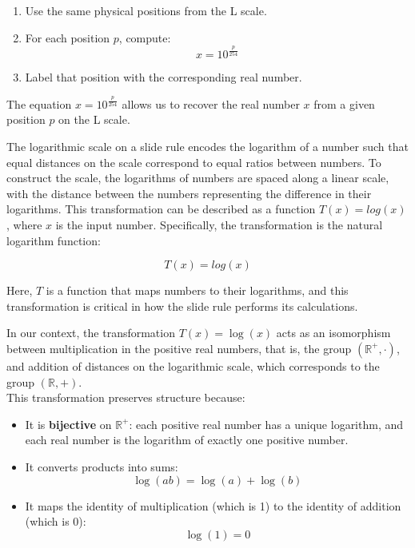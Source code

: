 \documentclass[10pt,twocolumn]{article}
\begin{document}
\begin{enumerate}
  \item Use the same physical positions from the L scale.
  \item For each position \( p \), compute:
  \[
  x = 10^{\frac{p}{254}}
  \]
  \item Label that position with the corresponding real number.
\end{enumerate}

The equation \( x = 10^{\frac{p}{254}} \) allows us to recover the real number \( x \) from a given position \( p \) on the L scale. 

The logarithmic scale on a slide rule encodes the logarithm of a number such that equal distances on the scale correspond to equal ratios between numbers. To construct the scale, the logarithms of numbers are spaced along a linear scale, with the distance between the numbers representing the difference in their logarithms. This transformation can be described as a function \( T(x) = log(x) \), where \( x \) is the input number. Specifically, the transformation is the natural logarithm function:

\[
T(x) = log(x)
\]

Here, \( T \) is a function that maps numbers to their logarithms, and this transformation is critical in how the slide rule performs its calculations.

In our context, the transformation \( T(x) = \log(x) \) acts as an isomorphism between multiplication in the positive real numbers, that is, the group \( (\mathbb{R}^+, \cdot) \), and addition of distances on the logarithmic scale, which corresponds to the group \( (\mathbb{R}, +) \).\\

This transformation preserves structure because:

\begin{itemize}
    \item It is \textbf{bijective} on \( \mathbb{R}^+ \): each positive real number has a unique logarithm, and each real number is the logarithm of exactly one positive number.\\
    \item It converts products into sums: 
    \[
    \log(ab) = \log(a) + \log(b)
    \]
    \item It maps the identity of multiplication (which is 1) to the identity of addition (which is 0):
    \[
    \log(1) = 0
    \]
\end{itemize}
\end{document}
